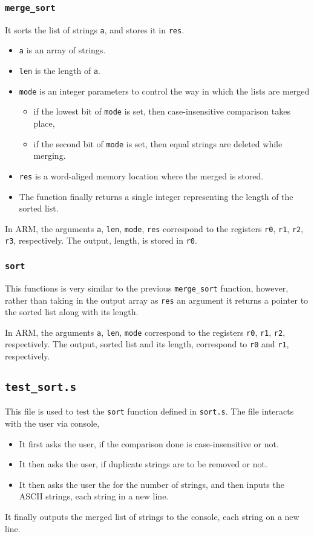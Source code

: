 \documentclass[a4paper]{scrartcl}
\theoremstyle{definition}
\renewcommand{\tt}{\texttt}
\newcommand{\fun}{\texttt}
\newcommand{\reg}{\texttt}
\begin{document}
\subsubsection*{\texttt{merge_sort}}
It sorts the list of strings \tt{a}, and stores it in \tt{res}.
\begin{itemize}
	\item \tt{a} is an array of strings.
	\item \tt{len} is the length of \tt{a}.
	\item \tt{mode} is an integer parameters to control the way in which the lists are merged
		\begin{itemize}
			\item if the lowest bit of \tt{mode} is set, then case-insensitive comparison takes place,
			\item if the second bit of \tt{mode} is set, then equal strings are deleted while merging.
		\end{itemize}
	\item \tt{res} is a word-aliged memory location where the merged is stored.
	\item The function finally returns a single integer representing the length of the sorted list.
\end{itemize}

In ARM, the arguments \tt{a}, \tt{len}, \tt{mode}, \tt{res} correspond to the registers \reg{r0}, \reg{r1}, \reg{r2}, \reg{r3}, respectively. The output, length, is stored in \reg{r0}.

\subsubsection*{\texttt{sort}}
This functions is very similar to the previous \fun{merge_sort} function, however, rather than taking in the output array as \tt{res} an argument it returns a pointer to the sorted list along with its length.

In ARM, the arguments \tt{a}, \tt{len}, \tt{mode} correspond to the registers \reg{r0}, \reg{r1}, \reg{r2}, respectively. The output, sorted list and its length, correspond to \reg{r0} and \reg{r1}, respectively.

\subsection*{\tt{test_sort.s}}
This file is used to test the \fun{sort} function defined in \tt{sort.s}. The file interacts with the user via console,
\begin{itemize}
	\item It first asks the user, if the comparison done is case-insensitive or not.
	\item It then asks the user, if duplicate strings are to be removed or not.
	\item It then asks the user the for the number of strings, and then inputs the ASCII strings, each string in a new line.
\end{itemize}
It finally outputs the merged list of strings to the console, each string on a new line.
\end{document}
